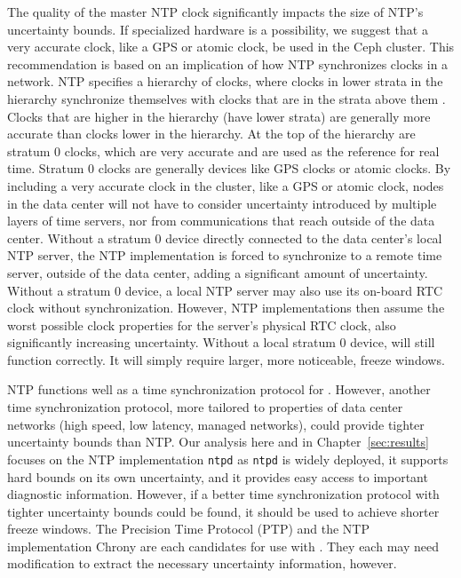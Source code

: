 The quality of the master NTP clock significantly impacts the size of
NTP's uncertainty bounds. If specialized hardware is a possibility, we 
suggest that a very accurate clock, like
a GPS or atomic clock, be used in the Ceph cluster. This
recommendation is based on an implication of how NTP synchronizes clocks in a
network. NTP specifies a hierarchy of clocks, where clocks in lower strata
in the hierarchy synchronize themselves with clocks that are in the
strata above them \citep{Burbank2010}. Clocks that are higher in the 
hierarchy (have lower strata) are
generally more accurate than clocks lower in the hierarchy. At the top
of the hierarchy are stratum 0 clocks, which are very accurate and are
used as the reference for real time. Stratum 0 clocks are generally 
devices like GPS clocks or atomic clocks. By including a very accurate
clock in the cluster, like a GPS or atomic clock, nodes in the data center
will not have to consider uncertainty introduced by multiple layers 
of time servers, nor from communications that reach outside of the
data center. Without a stratum 0 device directly connected to the 
data center's local NTP server, the NTP implementation is forced to synchronize
to a remote time server, outside of the data center, adding a significant
amount of uncertainty. Without a stratum 0 device, a local NTP server
may also use its on-board RTC clock without synchronization. However, 
NTP implementations then assume the worst possible clock
properties for the server's physical RTC clock, also significantly 
increasing uncertainty. Without a local stratum 0 device, \alg will
still function correctly. It will simply require larger, more noticeable,
freeze windows. 

NTP functions well as a time synchronization protocol for \alg.  
However, another time synchronization protocol, more
tailored to properties of data center networks 
(high speed, low latency, managed networks), 
could provide tighter uncertainty
bounds than NTP. Our analysis here and in Chapter~\ref{sec:results} 
focuses on the NTP implementation \texttt{ntpd} as \texttt{ntpd} is widely
deployed, it supports hard bounds on its own uncertainty, and it 
provides easy access to important
diagnostic information. However, if a better time synchronization
protocol with tighter uncertainty bounds could be found, it should be
used to achieve shorter freeze windows. The Precision Time Protocol (PTP)
and the NTP implementation Chrony are each candidates for use with \alg. 
They each may need modification to extract the
necessary uncertainty information, however.
